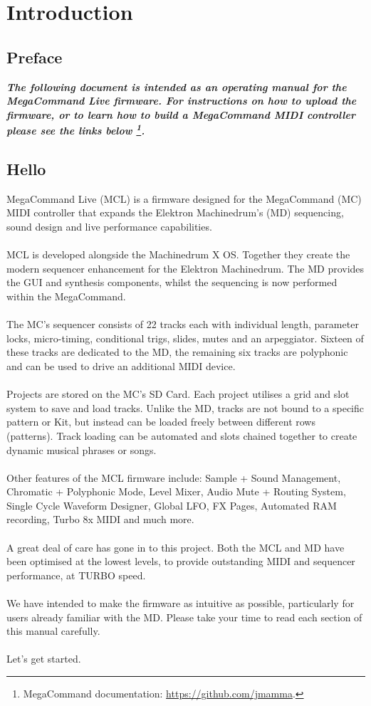 \chapter{Introduction}
\section{Preface}
\begin{small}
\textbf{\textit{The following document is intended as an operating manual for the MegaCommand Live firmware. For instructions on how to upload the firmware, or to learn how to build a MegaCommand MIDI controller please see the links below \footnote{MegaCommand documentation: \url{https://github.com/jmamma}.}.}}
\end{small}

\section{Hello}
MegaCommand Live (MCL) is a firmware designed for the MegaCommand (MC) MIDI controller that expands the Elektron Machinedrum's (MD) sequencing, sound design and live performance capabilities. 
\\
\\
MCL is developed alongside the Machinedrum X OS. Together they create the modern sequencer enhancement for the Elektron Machinedrum. The MD provides the GUI and synthesis components, whilst the sequencing is now performed within the MegaCommand.
\\
\\
The MC's sequencer consists of 22 tracks each with individual length, parameter locks, micro-timing, conditional trigs, slides, mutes and an arpeggiator. Sixteen of these tracks are dedicated to the MD, the remaining six tracks are polyphonic and can be used to drive an additional MIDI device.
\\
\\
Projects are stored on the MC's SD Card. Each project utilises a grid and slot system to save and load tracks. Unlike the MD, tracks are not bound to a specific pattern or Kit, but instead can be loaded freely between different rows (patterns). Track loading can be automated and slots chained together to create dynamic musical phrases or songs. 
\\
\\
Other features of the MCL firmware include: Sample + Sound Management, Chromatic + Polyphonic Mode,  Level Mixer, Audio Mute + Routing System, Single Cycle Waveform Designer, Global LFO, FX Pages, Automated RAM recording, Turbo 8x MIDI and much more.
\\
\\
A great deal of care has gone in to this project. Both the MCL and MD have been optimised at the lowest levels, to provide outstanding MIDI and sequencer performance, at TURBO speed.
\\
\\
We have intended to make the firmware as intuitive as possible, particularly for users already familiar with the MD. Please take your time to read each section of this manual carefully. 
\\
\\
Let's get started.